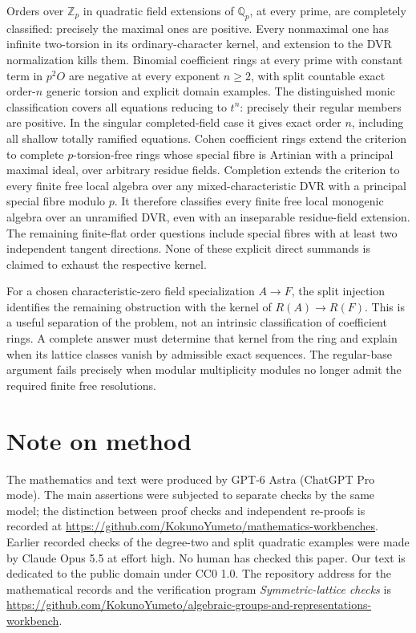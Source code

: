 \documentclass[11pt,a4paper]{article}
\theoremstyle{definition}\newtheorem{definition}[theorem]{Definition}
\theoremstyle{remark}\newtheorem{remark}[theorem]{Remark}
\newcommand{\Z}{\mathbb Z}\newcommand{\Q}{\mathbb Q}
\newcommand{\workbenchurl}{https://github.com/KokunoYumeto/algebraic-groups-and-representations-workbench}
\newcommand{\recordurl}{https://github.com/KokunoYumeto/mathematics-workbenches}
\begin{document}
Orders over $\Z_p$ in quadratic field extensions of $\Q_p$, at every prime, are
completely classified: precisely the
maximal ones are positive.  Every nonmaximal one has infinite two-torsion in its
ordinary-character kernel, and extension to the DVR normalization
kills them.  Binomial coefficient rings at every prime with constant
term in $p^2O$ are negative at every exponent $n\ge2$, with split
countable exact order-$n$ generic torsion and explicit domain examples.  The distinguished monic classification covers all equations reducing
to $t^n$: precisely their regular members are positive.  In the
singular completed-field case it gives exact order $n$, including
all shallow totally ramified equations.  Cohen coefficient rings
extend the criterion to complete $p$-torsion-free rings whose special
fibre is Artinian with a principal maximal ideal, over arbitrary
residue fields.  Completion extends the criterion to every finite free local algebra
over any mixed-characteristic DVR with a principal special fibre
modulo $p$.  It therefore classifies every finite free local
monogenic algebra over an unramified DVR, even with an inseparable
residue-field extension.
The remaining finite-flat order questions include special fibres
with at least two independent tangent directions.
None of these explicit direct summands
is claimed to exhaust the respective kernel.

For a chosen characteristic-zero field specialization $A\to F$,
the split injection identifies the remaining obstruction with
the kernel of $R(A)\to R(F)$.  This is a useful separation of
the problem, not an intrinsic classification of coefficient
rings.  A complete answer must determine that kernel from the
ring and explain when its lattice classes vanish by admissible
exact sequences.  The regular-base argument fails precisely
when modular multiplicity modules no longer admit the required
finite free resolutions.

\section*{Note on method}

The mathematics and text were produced by GPT-6 Astra (ChatGPT Pro
mode).  The main assertions were subjected to separate checks
by the same model; the distinction between proof checks and
independent re-proofs is recorded at \url{\recordurl}.
Earlier recorded checks of the degree-two and split quadratic
examples were made by Claude Opus 5.5 at effort high.
No human has checked this paper.  Our text is dedicated to the
public domain under CC0 1.0.  The repository address for the
mathematical records and the verification program
\emph{Symmetric-lattice checks} is \url{\workbenchurl}.
\end{document}
